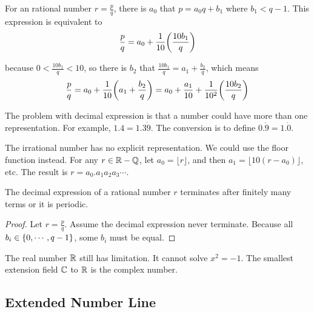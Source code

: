 \begin{example}
    For an rational number $r = \frac{p}{q}$, there is $a_0$ that $p = a_0 q + b_1$ where $b_1 < q-1$. This expression is equivalent to 
    \begin{equation}
        \frac{p}{q} = a_0 + \frac{1}{10} \mleft(\frac{10 b_1}{q} \mright)
    \end{equation}
    
    because $0 < \frac{10 b_1}{q} < 10$, so there is $b_2$ that $\frac{10 b_1}{q} = a_1 + \frac{b_2}{q}$, which means
    \begin{equation}
        \frac{p}{q} = a_0 + \frac{1}{10} \mleft( a_1 + \frac{b_2}{q} \mright) = a_0 + \frac{a_1}{10} + \frac{1}{10^2} \mleft(\frac{10 b_2}{q} \mright)
    \end{equation}
    
    The problem with decimal expression is that a number could have more than one representation. For example, $1.4 = 1.3 \dot 9$. The conversion is to define $0.\dot 9 = 1.\dot 0$.
    
    The irrational number has no explicit representation. We could use the floor function instead. For any $r \in \mathbb{R} - \mathbb{Q}$, let $a_0 = \lfloor r \rfloor$, and then $a_1 = \lfloor 10(r-a_0) \rfloor$, etc. The result is $r = a_0 . a_1 a_2 a_3 \cdots$.
\end{example}

\begin{theorem}
    The decimal expression of a rational number $r$ terminates after finitely many terms or it is periodic.    
\end{theorem}
\begin{proof}
    Let $r = \frac{p}{q}$. Assume the decimal expression never terminate. Because all $b_i \in \set{0, \cdots, q -1}$, some $b_i$ must be equal.
\end{proof}





The real number $\mathbb{R}$ still has limitation. It cannot solve $x^2 = -1$. The smallest extension field $\mathbb{C}$ to $\mathbb{R}$ is the complex number.



\subsection{Extended Number Line}

